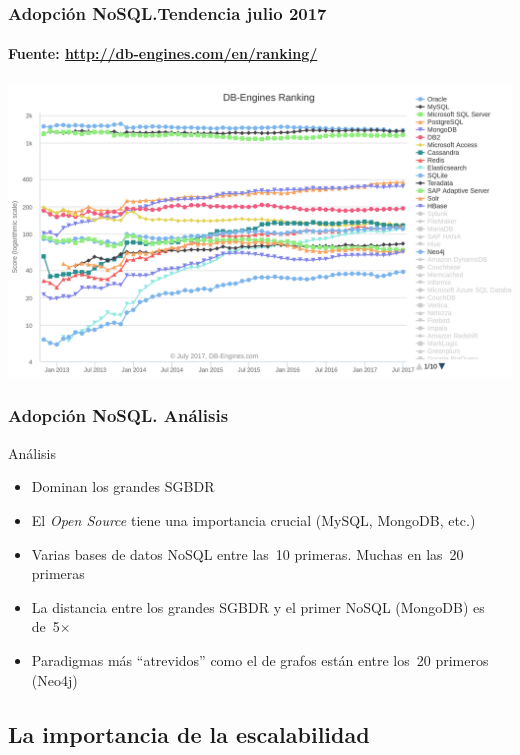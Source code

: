 \documentclass[14pt]{beamer}
\begin{document}
\begin{frame}
\frametitle{Adopción NoSQL.Tendencia julio 2017}
\framesubtitle{Fuente: \url{http://db-engines.com/en/ranking/}}
\includegraphics[width=\textwidth]{img/nosql-database-ranking}
\end{frame}

\begin{frame}
  \frametitle{Adopción NoSQL. Análisis}
\begin{alertblock}{Análisis}
\begin{itemize}
\item Dominan los grandes SGBDR
\item El {\em Open Source} tiene una importancia crucial (MySQL,
  MongoDB, etc.)
\item Varias bases de datos NoSQL entre las~10 primeras. Muchas en las~20
  primeras
\item La distancia entre los grandes SGBDR y el primer NoSQL (MongoDB) es
  de~5$\times$
\item Paradigmas más ``atrevidos'' como el de grafos están entre los~20
  primeros (Neo4j)
\end{itemize}
  \end{alertblock}
\end{frame}



\subsection{La importancia de la escalabilidad}


\newsavebox{\network}

\begin{lrbox}{\network}
\end{lrbox}
\end{document}
